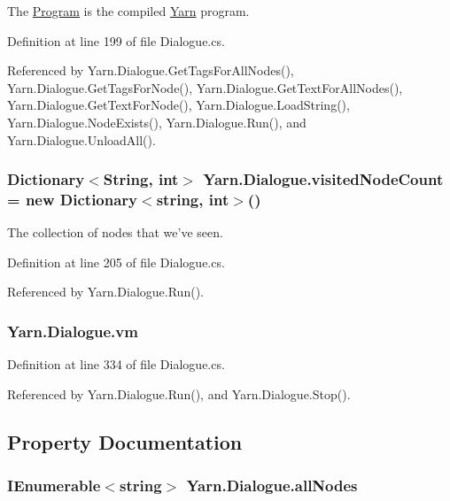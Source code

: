 The \hyperlink{a00138}{Program} is the compiled \hyperlink{a00048}{Yarn} program. 



Definition at line 199 of file Dialogue.\-cs.



Referenced by Yarn.\-Dialogue.\-Get\-Tags\-For\-All\-Nodes(), Yarn.\-Dialogue.\-Get\-Tags\-For\-Node(), Yarn.\-Dialogue.\-Get\-Text\-For\-All\-Nodes(), Yarn.\-Dialogue.\-Get\-Text\-For\-Node(), Yarn.\-Dialogue.\-Load\-String(), Yarn.\-Dialogue.\-Node\-Exists(), Yarn.\-Dialogue.\-Run(), and Yarn.\-Dialogue.\-Unload\-All().

\hypertarget{a00088_aae9e64354066a1e2fa130629959d772b}{
\subsubsection[{visited\-Node\-Count}]{\setlength{\rightskip}{0pt plus 5cm}Dictionary$<${\bf String}, int$>$ Yarn.\-Dialogue.\-visited\-Node\-Count = new Dictionary$<$string, int$>$()}}\label{a00088_aae9e64354066a1e2fa130629959d772b}


The collection of nodes that we've seen. 



Definition at line 205 of file Dialogue.\-cs.



Referenced by Yarn.\-Dialogue.\-Run().

\hypertarget{a00088_a8c1319357a9df6cff051328fb33224c7}{
\subsubsection[{vm}]{ Yarn.\-Dialogue.\-vm\hspace{0.3cm}{\ttfamily [private]}}}\label{a00088_a8c1319357a9df6cff051328fb33224c7}


Definition at line 334 of file Dialogue.\-cs.



Referenced by Yarn.\-Dialogue.\-Run(), and Yarn.\-Dialogue.\-Stop().



\subsection{Property Documentation}
\hypertarget{a00088_a0ee573e3d072bccf98ba1d975612d42c}{
\subsubsection[{all\-Nodes}]{\setlength{\rightskip}{0pt plus 5cm}I\-Enumerable$<$string$>$ Yarn.\-Dialogue.\-all\-Nodes\hspace{0.3cm}{\ttfamily [get]}}}\label{a00088_a0ee573e3d072bccf98ba1d975612d42c}


